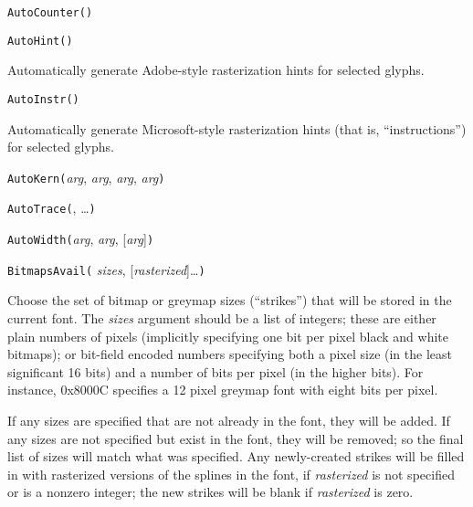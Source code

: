 

\texttt{AutoCounter(}\texttt{)}



\texttt{AutoHint()}

Automatically generate Adobe-style rasterization hints for selected
glyphs.



\texttt{AutoInstr()}

Automatically generate Microsoft-style rasterization hints (that is,
``instructions'') for selected glyphs.



\texttt{AutoKern(}\textit{arg}, \textit{arg}, \textit{arg}, \textit{arg}\texttt{)}



\texttt{AutoTrace(}, \ldots\texttt{)}



\texttt{AutoWidth(}\textit{arg}, \textit{arg}, [\textit{arg}]\texttt{)}



\texttt{BitmapsAvail(} \textit{sizes}, [\textit{rasterized}]\ldots\texttt{)}

Choose the set of bitmap or greymap sizes (``strikes'') that will be stored
in the current font.  The \textit{sizes} argument should be a list of
integers; these are either plain numbers of pixels (implicitly specifying
one bit per pixel black and white bitmaps); or bit-field encoded numbers
specifying both a pixel size (in the least significant 16 bits) and a number
of bits per pixel (in the higher bits).  For instance, 0x8000C specifies a
12 pixel greymap font with eight bits per pixel.

If any sizes are specified that are not already in the font, they will be
added.  If any sizes are not specified but exist in the font, they will be
removed; so the final list of sizes will match what was specified.  Any
newly-created strikes will be filled in with rasterized versions of the
splines in the font, if \textit{rasterized} is not specified or is a nonzero
integer; the new strikes will be blank if \textit{rasterized} is zero.

